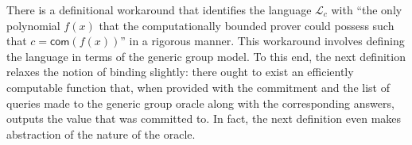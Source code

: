 \documentclass[10pt]{llncs}
\begin{document}


There is a definitional workaround that identifies the language $\mathcal{L}_c$ with ``the only polynomial $f(x)$ that the computationally bounded prover could possess such that $c = \mathsf{com}(f(x))$'' in a rigorous manner. This workaround involves defining the language in terms of the generic group model. To this end, the next definition relaxes the notion of binding slightly: there ought to exist an efficiently computable function that, when provided with the commitment and the list of queries made to the generic group oracle along with the corresponding answers, outputs the value that was committed to. In fact, the next definition even makes abstraction of the nature of the oracle.
\end{document}
